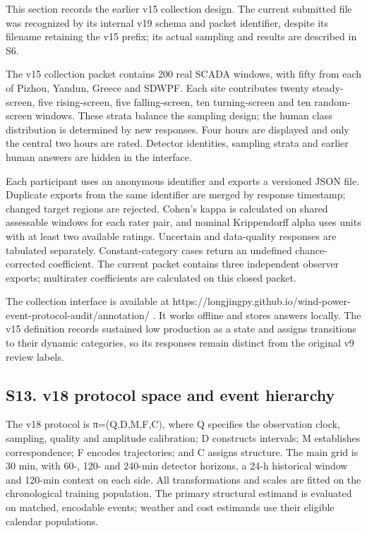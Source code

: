 \documentclass[a4paper,11pt]{article}
\begin{document}
This section records the earlier v15 collection design. The current submitted file was recognized by its internal v19 schema and packet identifier, despite its filename retaining the v15 prefix; its actual sampling and results are described in S6.

The v15 collection packet contains 200 real SCADA windows, with fifty from each of Pizhou, Yandun, Greece and SDWPF. Each site contributes twenty steady-screen, five rising-screen, five falling-screen, ten turning-screen and ten random-screen windows. These strata balance the sampling design; the human class distribution is determined by new responses. Four hours are displayed and only the central two hours are rated. Detector identities, sampling strata and earlier human answers are hidden in the interface.

Each participant uses an anonymous identifier and exports a versioned JSON file. Duplicate exports from the same identifier are merged by response timestamp; changed target regions are rejected. Cohen's kappa is calculated on shared assessable windows for each rater pair, and nominal Krippendorff alpha uses units with at least two available ratings. Uncertain and data-quality responses are tabulated separately. Constant-category cases return an undefined chance-corrected coefficient. The current packet contains three independent observer exports; multirater coefficients are calculated on this closed packet.

The collection interface is available at https://longjingpy.github.io/wind-power-event-protocol-audit/annotation/ . It works offline and stores answers locally. The v15 definition records sustained low production as a state and assigns transitions to their dynamic categories, so its responses remain distinct from the original v9 review labels.

\subsection{S13. v18 protocol space and event hierarchy}\label{s13.-v18-protocol-space-and-event-hierarchy}

The v18 protocol is π=(Q,D,M,F,C), where Q specifies the observation clock, sampling, quality and amplitude calibration; D constructs intervals; M establishes correspondence; F encodes trajectories; and C assigns structure. The main grid is 30 min, with 60-, 120- and 240-min detector horizons, a 24-h historical window and 120-min context on each side. All transformations and scales are fitted on the chronological training population. The primary structural estimand is evaluated on matched, encodable events; weather and cost estimands use their eligible calendar populations.
\end{document}
